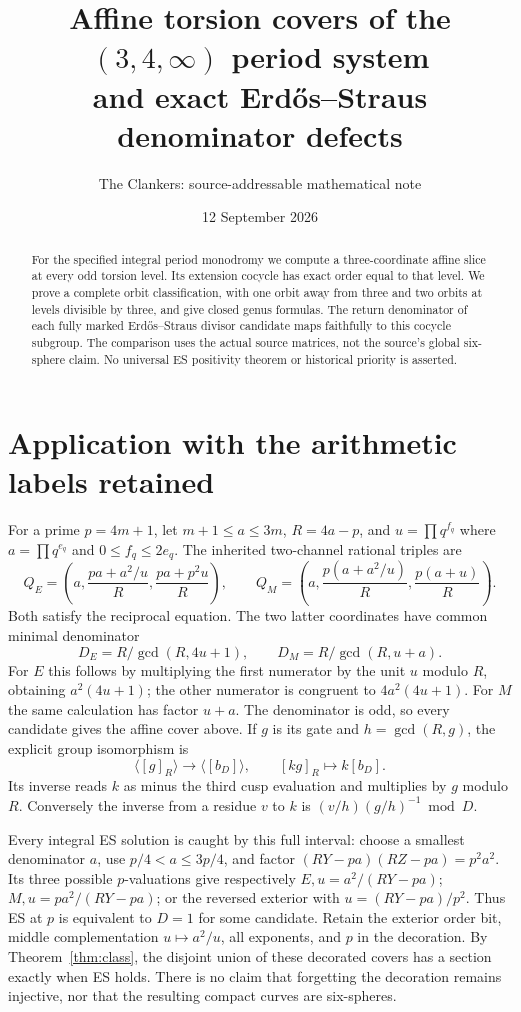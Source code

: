 \documentclass[10pt,reqno]{amsart}
\title[Affine torsion covers and ES denominator defects]{Affine torsion covers of the $(3,4,\infty)$ period system\\
and exact Erd\H{o}s--Straus denominator defects}
\author{The Clankers: source-addressable mathematical note}
\date{12 September 2026}
\begin{document}
\begin{abstract}
For the specified integral period monodromy we compute a three-coordinate
affine slice at every odd torsion level. Its extension cocycle has exact
order equal to that level. We prove a complete orbit classification, with
one orbit away from three and two orbits at levels divisible by three,
and give closed genus formulas. The return denominator of each fully
marked Erd\H{o}s--Straus divisor candidate maps faithfully to this cocycle
subgroup. The comparison uses the actual source matrices, not the source's
global six-sphere claim. No universal ES positivity theorem or historical
priority is asserted.
\end{abstract}\maketitle

\section{Application with the arithmetic labels retained}
For a prime $p=4m+1$, let $m+1\le a\le3m$, $R=4a-p$, and
$u=\prod q^{f_q}$ where $a=\prod q^{e_q}$ and $0\le f_q\le2e_q$.
The inherited two-channel rational triples are
\[
 Q_E=\left(a,\frac{pa+a^2/u}{R},\frac{pa+p^2u}{R}\right),\qquad
 Q_M=\left(a,\frac{p(a+a^2/u)}R,\frac{p(a+u)}R\right).
\]
Both satisfy the reciprocal equation. The two latter coordinates have
common minimal denominator
\[
 D_E=R/\gcd(R,4u+1),\qquad D_M=R/\gcd(R,u+a).
\]
For $E$ this follows by multiplying the first numerator by the unit $u$
modulo $R$, obtaining $a^2(4u+1)$; the other numerator is congruent to
$4a^2(4u+1)$. For $M$ the same calculation has factor $u+a$.
The denominator is odd, so every candidate gives the affine cover above.
If $g$ is its gate and $h=\gcd(R,g)$, the explicit group isomorphism is
\[
 \langle[g]_R\rangle\longrightarrow\langle[b_D]\rangle,
 \qquad [kg]_R\longmapsto k[b_D].
\]
Its inverse reads $k$ as minus the third cusp evaluation and multiplies
by $g$ modulo $R$. Conversely the inverse from a residue $v$ to $k$ is
$(v/h)(g/h)^{-1}\bmod D$.

Every integral ES solution is caught by this full interval: choose a
smallest denominator $a$, use $p/4<a\le3p/4$, and factor
$(RY-pa)(RZ-pa)=p^2a^2$. Its three possible $p$-valuations give respectively
$E,u=a^2/(RY-pa)$; $M,u=pa^2/(RY-pa)$; or the reversed exterior with
$u=(RY-pa)/p^2$. Thus ES at $p$ is equivalent to $D=1$ for some candidate.
Retain the exterior order bit, middle complementation $u\mapsto a^2/u$,
all exponents, and $p$ in the decoration. By Theorem~\ref{thm:class},
the disjoint union of these decorated covers has a section exactly when
ES holds. There is no claim that forgetting the decoration remains
injective, nor that the resulting compact curves are six-spheres.
\end{document}
